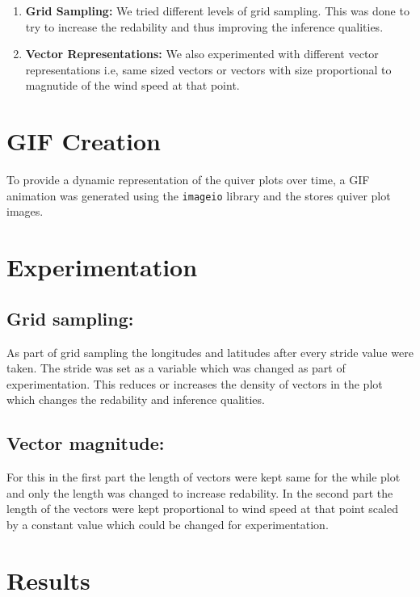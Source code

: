 \documentclass[conference]{IEEEtran}
\begin{document}
\begin{enumerate}
  \item \textbf{Grid Sampling:} We tried different levels of grid sampling. This was done to try to increase the redability and thus improving the inference qualities.

  \item \textbf{Vector Representations:} We also experimented with different vector representations i.e, same sized vectors or vectors with size proportional to magnutide of the wind speed at that point.
\end{enumerate}




\section{GIF Creation}

To provide a dynamic representation of the quiver plots over time, a GIF animation was generated using the \texttt{imageio} library and the stores quiver plot images.




\section{Experimentation}

\subsection{Grid sampling:} As part of grid sampling the longitudes and latitudes after every stride value were taken. The stride was set as a variable which was changed as part of experimentation. This reduces or increases the density of vectors in the plot which changes the redability and inference qualities. 

\subsection{Vector magnitude:} For this in the first part the length of vectors were kept same for the while plot and only the length was changed to increase redability. In the second part the length of the vectors were kept proportional to wind speed at that point scaled by a constant value which could be changed for experimentation.



\section{Results}
\end{document}

